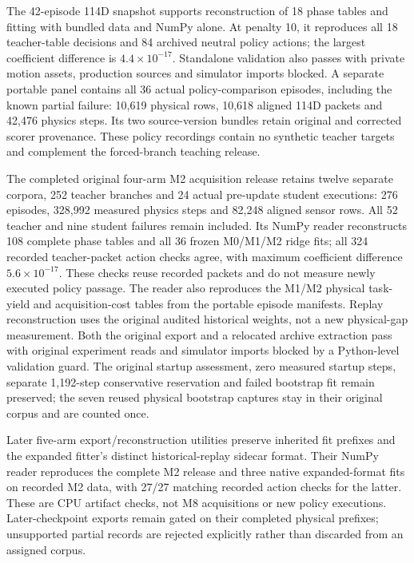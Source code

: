 The 42-episode 114D snapshot supports reconstruction of 18 phase tables and
fitting with bundled data and NumPy alone. At penalty 10, it reproduces all 18
teacher-table decisions and 84 archived neutral policy actions; the largest
coefficient difference is $4.4\times10^{-17}$. Standalone validation also passes
with private motion assets, production sources and simulator imports blocked.
A separate portable panel contains all 36 actual policy-comparison episodes,
including the known partial failure: 10,619 physical rows, 10,618 aligned 114D
packets and 42,476 physics steps. Its two source-version bundles retain original
and corrected scorer provenance. These policy recordings contain no synthetic
teacher targets and complement the forced-branch teaching release.

The completed original four-arm M2 acquisition release retains twelve separate
corpora, 252 teacher branches and 24 actual pre-update student executions:
276 episodes, 328,992 measured physics steps and 82,248 aligned sensor rows.
All 52 teacher and nine student failures remain included. Its NumPy reader
reconstructs 108 complete phase tables and all 36 frozen M0/M1/M2 ridge fits;
all 324 recorded teacher-packet action checks agree, with maximum coefficient
difference $5.6\times10^{-17}$. These checks reuse recorded packets and do not
measure newly executed policy passage. The reader also reproduces the M1/M2
physical task-yield and acquisition-cost tables from the portable episode
manifests. Replay reconstruction uses the original audited historical weights,
not a new physical-gap measurement. Both the original export and a relocated
archive extraction pass with original experiment reads and simulator imports
blocked by a Python-level validation guard. The original startup assessment,
zero measured startup steps, separate 1,192-step conservative reservation and
failed bootstrap fit remain preserved; the seven reused physical bootstrap
captures stay in their original corpus and are counted once.

Later five-arm export/reconstruction utilities preserve inherited fit prefixes
and the expanded fitter's distinct historical-replay sidecar format. Their
NumPy reader reproduces the complete M2 release and three native expanded-format
fits on recorded M2 data, with 27/27 matching recorded action checks for the
latter. These are CPU artifact checks, not M8 acquisitions or new policy
executions. Later-checkpoint exports remain gated on their completed physical
prefixes; unsupported partial records are rejected explicitly rather than
discarded from an assigned corpus.


